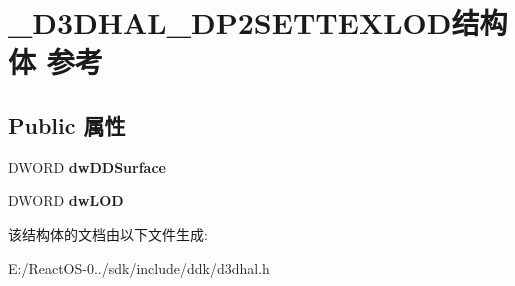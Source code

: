 \hypertarget{struct___d3_d_h_a_l___d_p2_s_e_t_t_e_x_l_o_d}{}\section{\+\_\+\+D3\+D\+H\+A\+L\+\_\+\+D\+P2\+S\+E\+T\+T\+E\+X\+L\+O\+D结构体 参考}
\label{struct___d3_d_h_a_l___d_p2_s_e_t_t_e_x_l_o_d}
\subsection*{Public 属性}
\begin{DoxyCompactItemize}
\item 
\mbox{\label{struct___d3_d_h_a_l___d_p2_s_e_t_t_e_x_l_o_d_ae9234f62562ed81789fa9fff22879f7e}} 
D\+W\+O\+RD {\bfseries dw\+D\+D\+Surface}
\item 
\mbox{\label{struct___d3_d_h_a_l___d_p2_s_e_t_t_e_x_l_o_d_aa5c79ab57949dcdaa773299af5877479}} 
D\+W\+O\+RD {\bfseries dw\+L\+OD}
\end{DoxyCompactItemize}


该结构体的文档由以下文件生成\+:\begin{DoxyCompactItemize}
\item 
E\+:/\+React\+O\+S-\/0../sdk/include/ddk/d3dhal.\+h\end{DoxyCompactItemize}
